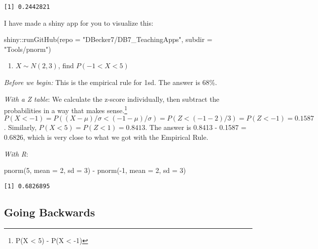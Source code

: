 \documentclass[
  letterpaper,
  DIV=11,
  numbers=noendperiod]{scrreprt}
\newenvironment{Shaded}{\begin{snugshade}}{\end{snugshade}}
\newcommand{\AttributeTok}[1]{\textcolor[rgb]{0.40,0.45,0.13}{#1}}
\newcommand{\DecValTok}[1]{\textcolor[rgb]{0.68,0.00,0.00}{#1}}
\newcommand{\FunctionTok}[1]{\textcolor[rgb]{0.28,0.35,0.67}{#1}}
\newcommand{\NormalTok}[1]{\textcolor[rgb]{0.00,0.23,0.31}{#1}}
\newcommand{\SpecialCharTok}[1]{\textcolor[rgb]{0.37,0.37,0.37}{#1}}
\newcommand{\StringTok}[1]{\textcolor[rgb]{0.13,0.47,0.30}{#1}}
\providecommand{\tightlist}{%
  \setlength{\itemsep}{0pt}\setlength{\parskip}{0pt}}\usepackage{longtable,booktabs,array}
\begin{document}
\begin{verbatim}
[1] 0.2442821
\end{verbatim}

I have made a shiny app for you to visualize this:

\begin{Shaded}
\begin{Highlighting}[]
\NormalTok{shiny}\SpecialCharTok{::}\FunctionTok{runGitHub}\NormalTok{(}\AttributeTok{repo =} \StringTok{"DBecker7/DB7\_TeachingApps"}\NormalTok{, }
    \AttributeTok{subdir =} \StringTok{"Tools/pnorm"}\NormalTok{)}
\end{Highlighting}
\end{Shaded}

\begin{enumerate}
\def\labelenumi{\arabic{enumi}.}
\setcounter{enumi}{5}
\tightlist
\item
  \(X \sim N(2,3)\), find \(P(-1 < X < 5)\)
\end{enumerate}

\emph{Before we begin:} This is the empirical rule for 1sd. The answer
is 68\%.

\emph{With a Z table}: We calculate the z-score individually, then
subtract the probabilities in a way that makes sense.\footnote{P(X
  \textless{} 5) - P(X \textless{} -1)}
\(P(X < -1) = P((X-\mu)/\sigma < (-1 - \mu)/\sigma) = P(Z < (-1 - 2)/3) = P(Z < -1) = 0.1587\).
Similarly, \(P(X < 5) = P(Z < 1) = 0.8413\). The answer is 0.8413 -
0.1587 = 0.6826, which is very close to what we got with the Empirical
Rule.

\emph{With R}:

\begin{Shaded}
\begin{Highlighting}[]
\FunctionTok{pnorm}\NormalTok{(}\DecValTok{5}\NormalTok{, }\AttributeTok{mean =} \DecValTok{2}\NormalTok{, }\AttributeTok{sd =} \DecValTok{3}\NormalTok{) }\SpecialCharTok{{-}} \FunctionTok{pnorm}\NormalTok{(}\SpecialCharTok{{-}}\DecValTok{1}\NormalTok{, }\AttributeTok{mean =} \DecValTok{2}\NormalTok{, }\AttributeTok{sd =} \DecValTok{3}\NormalTok{)}
\end{Highlighting}
\end{Shaded}

\begin{verbatim}
[1] 0.6826895
\end{verbatim}

\hypertarget{going-backwards}{%
\subsection{Going Backwards}\label{going-backwards}}
\end{document}
